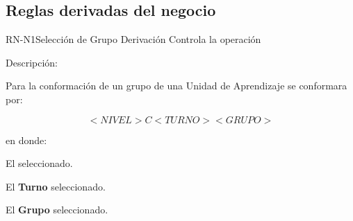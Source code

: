 \subsection{Reglas derivadas del negocio}


\begin{BusinessRule}{RN-N1}{Selección de Grupo}
	{Derivación}
	{Controla la operación}
	\item[Descripción:] 
	
	Para la conformación de un grupo de una Unidad de Aprendizaje se conformara por:
	
	$$ <NIVEL> C <TURNO> <GRUPO> $$
	
	en donde: \\
	
	\begin{UClist}
    
    	 El  seleccionado.
	
    	 El \textbf{Turno} seleccionado.
	
	 El \textbf{Grupo} seleccionado.
	    	    
  	\end{UClist}

\end{BusinessRule}
